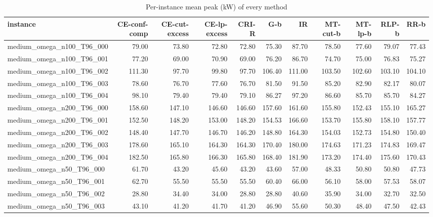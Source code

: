 \begin{table}[htbp]
\centering
\small
\caption{Per-instance mean peak (kW) of every method}
\label{tab:E2b_head_to_head_budgets_b10_per_instance}
\begin{tabular}{lrrrrrrrrrr}
\toprule
instance & CE-conf-comp & CE-cut-excess & CE-lp-excess & CRI-R & G-b & IR & MT-cut-b & MT-lp-b & RLP-b & RR-b \\
\midrule
medium\_omega\_n100\_T96\_000 & 79.00 & 73.80 & 72.80 & 72.80 & 75.30 & 87.70 & 78.50 & 77.60 & 79.07 & 77.43 \\
medium\_omega\_n100\_T96\_001 & 77.20 & 69.00 & 70.90 & 69.00 & 76.20 & 86.70 & 74.70 & 75.00 & 76.83 & 75.27 \\
medium\_omega\_n100\_T96\_002 & 111.30 & 97.70 & 99.80 & 97.70 & 106.40 & 111.00 & 103.50 & 102.60 & 103.10 & 104.10 \\
medium\_omega\_n100\_T96\_003 & 78.60 & 76.70 & 77.60 & 76.70 & 81.50 & 91.50 & 85.20 & 82.90 & 82.17 & 80.07 \\
medium\_omega\_n100\_T96\_004 & 98.10 & 79.40 & 79.40 & 79.10 & 86.27 & 97.20 & 86.60 & 85.70 & 85.70 & 84.27 \\
medium\_omega\_n200\_T96\_000 & 158.60 & 147.10 & 146.60 & 146.60 & 157.60 & 161.60 & 155.80 & 152.43 & 155.10 & 165.27 \\
medium\_omega\_n200\_T96\_001 & 152.50 & 148.20 & 153.00 & 148.20 & 154.53 & 166.60 & 153.70 & 155.80 & 158.10 & 157.77 \\
medium\_omega\_n200\_T96\_002 & 148.40 & 147.70 & 146.70 & 146.20 & 148.80 & 164.30 & 154.03 & 152.73 & 154.80 & 150.40 \\
medium\_omega\_n200\_T96\_003 & 178.60 & 165.10 & 164.30 & 164.30 & 170.40 & 180.00 & 174.63 & 171.23 & 174.83 & 169.47 \\
medium\_omega\_n200\_T96\_004 & 182.50 & 165.80 & 166.30 & 165.80 & 168.40 & 181.90 & 173.20 & 174.40 & 175.60 & 170.43 \\
medium\_omega\_n50\_T96\_000 & 61.70 & 43.20 & 45.60 & 43.20 & 43.60 & 57.00 & 48.33 & 50.80 & 50.80 & 47.73 \\
medium\_omega\_n50\_T96\_001 & 62.70 & 55.50 & 55.50 & 55.50 & 60.40 & 66.00 & 56.10 & 58.00 & 57.53 & 58.07 \\
medium\_omega\_n50\_T96\_002 & 28.80 & 34.40 & 34.00 & 28.80 & 28.80 & 40.60 & 35.90 & 34.00 & 32.70 & 32.50 \\
medium\_omega\_n50\_T96\_003 & 43.10 & 41.20 & 41.70 & 41.20 & 46.90 & 55.60 & 50.30 & 48.40 & 47.50 & 42.43 \\

\end{tabular}
\end{table}
